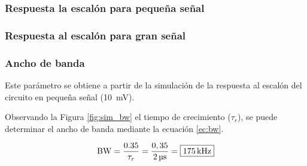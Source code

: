 \subsubsection{Respuesta la escalón para pequeña señal}



\subsubsection{Respuesta al escalón para gran señal}



\subsubsection{Ancho de banda}

	Este parámetro se obtiene a partir de la simulación de la respuesta al escalón del circuito en pequeña señal (\SI{10}{\milli\volt}).
	


	Observando la Figura \ref{fig:sim_bw} el tiempo de crecimiento ($\tau_r$), se puede determinar el ancho de banda mediante la ecuación \eqref{ec:bw}.

	\begin{equation}
		\centering
		\mathrm{BW} = \frac{\num{0,35}}{\tau_r} = \frac{0,35}{\SI{2}{\micro\second}} = \boxed{\SI{175}{\kilo\hertz}}
		\label{ec:bw}
	\end{equation}

